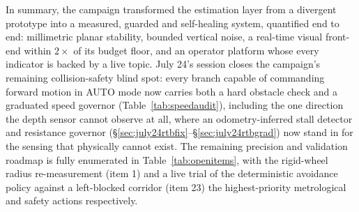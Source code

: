 \FloatBarrier
In summary, the campaign transformed the estimation layer from a divergent
prototype into a measured, guarded and self-healing system, quantified end to
end: millimetric planar stability, bounded vertical noise, a real-time visual
front-end within $2\times$ of its budget floor, and an operator platform whose
every indicator is backed by a live topic. July 24's session closes the
campaign's remaining collision-safety blind spot: every branch capable of
commanding forward motion in AUTO mode now carries both a hard obstacle
check and a graduated speed governor (Table~\ref{tab:speedaudit}), including
the one direction the depth sensor cannot observe at all, where an
odometry-inferred stall detector and resistance governor
(\S\ref{sec:july24rtbfix}--\S\ref{sec:july24rtbgrad}) now stand in for the
sensing that physically cannot exist. The remaining precision and validation
roadmap is fully enumerated in Table~\ref{tab:openitems}, with the rigid-wheel
radius re-measurement (item 1) and a live trial of the deterministic
avoidance policy against a left-blocked corridor (item 23) the
highest-priority metrological and safety actions respectively.
